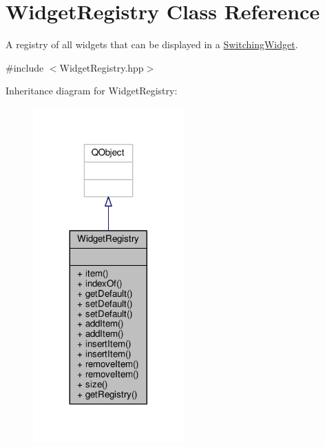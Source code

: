\hypertarget{class_widget_registry}{}\section{Widget\+Registry Class Reference}
\label{class_widget_registry}


A registry of all widgets that can be displayed in a \hyperlink{class_switching_widget}{Switching\+Widget}.  




{\ttfamily \#include $<$Widget\+Registry.\+hpp$>$}



Inheritance diagram for Widget\+Registry\+:
\nopagebreak
\begin{figure}[H]
\begin{center}
\leavevmode
\includegraphics[width=164pt]{class_widget_registry__inherit__graph}
\end{center}
\end{figure}


